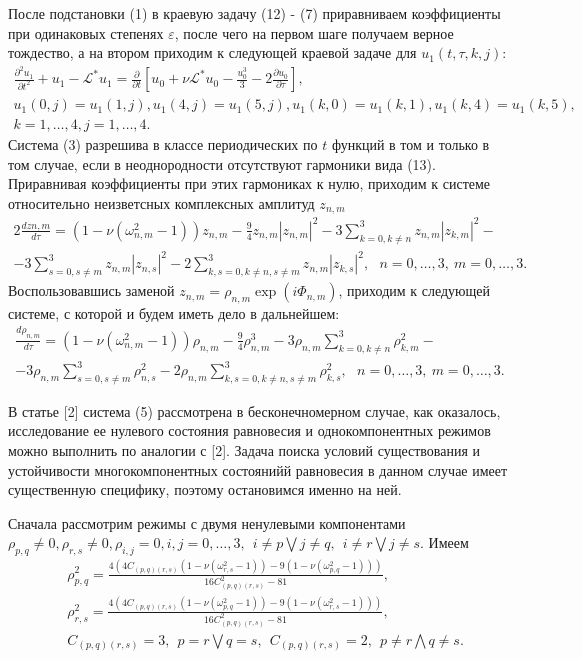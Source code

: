 \documentclass[12pt]{article}  %
\begin{document}
После подстановки (1) в краевую задачу (12) \-- (7) приравниваем коэффициенты при одинаковых степенях $\varepsilon$, после чего на первом шаге получаем верное тождество, а на втором приходим к следующей краевой задаче для $u_1(t,\tau,k,j):$
\begin{multline}
\frac{\partial^2u_1}{\partial t^2}+u_1-\mathcal{L}^{*}u_1 = \frac{\partial}{\partial t}\left[u_0+\nu \mathcal{L}^{*}u_0-\frac{u_0^3}{3}-2\frac{\partial u_0}{\partial\tau}\right],\\
u_1(0,j)=u_1(1,j), u_1(4,j)=u_1(5,j), u_1(k,0)=u_1(k,1), u_1(k,4)=u_1(k,5), \\
k=1,\dots,4, j=1,\dots,4.
\end{multline}
Система (3) разрешива в классе периодических по $t$ функций в том и только в том случае, если в неоднородности отсутствуют гармоники вида (13). Приравнивая коэффициенты при этих гармониках к нулю, приходим к системе относительно неизветсных комплексных амплитуд $z_{n,m}$
\begin{multline}
2\frac{dz{n,m}}{d\tau}=(1-\nu(\omega_{n,m}^2-1))z_{n,m}-\frac94 z_{n,m}|z_{n,m}|^2 - 3\sum_{k=0,k\not=n}^{3}z_{n,m}|z_{k,m}|^2 - \\
-3\sum_{s=0,s\not=m}^{3}z_{n,m}|z_{n,s}|^2-2\sum_{k,s=0,k\not=n,s\not=m}^{3}z_{n,m}|z_{k,s}|^2, \ \ \ n=0,\dots,3, \ m=0,\dots,3.
\end{multline}
Воспользовавшись заменой $z_{n,m}=\rho_{n,m}\exp(i\varPhi_{n,m})$, приходим к следующей системе, с которой и будем иметь дело в дальнейшем:
\begin{multline}
\frac{d\rho_{n,m}}{d\tau}=(1-\nu(\omega_{n,m}^2-1))\rho_{n,m}-\frac94 \rho_{n,m}^3 - 3\rho_{n,m}\sum_{k=0,k\not=n}^{3}\rho_{k,m}^2 - \\
-3\rho_{n,m}\sum_{s=0,s\not=m}^{3}\rho_{n,s}^2-2\rho_{n,m}\sum_{k,s=0,k\not=n,s\not=m}^{3}\rho_{k,s}^2,\ \ \ n=0,\dots,3, \ m=0,\dots,3.
\end{multline}

В статье [2] система (5) рассмотрена в бесконечномерном случае, как оказалось, исследование ее нулевого состояния равновесия и однокомпонентных режимов можно выполнить по аналогии с [2]. Задача поиска условий существования и устойчивости многокомпонентных состоянийй равновесия в данном случае имеет существенную специфику, поэтому остановимся именно на ней. 

Сначала рассмотрим режимы с двумя ненулевыми компонентами $\rho_{p,q} \not=0, \rho_{r,s}\not=0, \rho_{i,j}=0, i,j=0,\dots,3, \ \ i\not=p \bigvee j\not=q, \ \ i\not=r \bigvee j\not=s$. Имеем 
\begin{equation}
\begin{split}
&\rho_{p,q}^2 = \frac{4(4C_{(p,q)(r,s)}(1-\nu(\omega_{r,s}^2-1))-9(1-\nu(\omega_{p,q}^2-1)))}{16C^2_{(p,q)(r,s)}-81},\\
&\rho_{r,s}^2 = \frac{4(4C_{(p,q)(r,s)}(1-\nu(\omega_{p,q}^2-1))-9(1-\nu(\omega_{r,s}^2-1)))}{16C^2_{(p,q)(r,s)}-81},\\
&C_{(p,q)(r,s)}=3, \ \ p=r \bigvee q=s, \ \  C_{(p,q)(r,s)}=2, \ \ p\not=r \bigwedge  q\not=s.
\end{split}
\end{equation}
\end{document}
